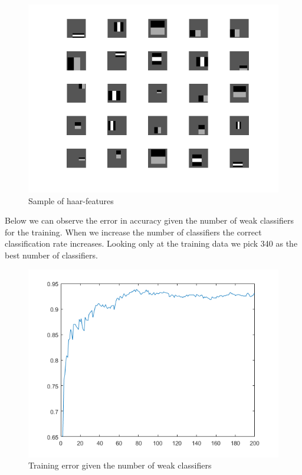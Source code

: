 \documentclass[a4paper,12pt]{article}
\begin{document}
\begin{figure}[H]
\centering
\caption{Sample of haar-features}\label{fig:sample_haar_features}
  \begin{minipage}[]{0.8\textwidth}
  \includegraphics[width=\textwidth]{figures/sample_of_haar_features.png}
  \end{minipage}
\end{figure}

Below we can observe the error in accuracy given the number of weak classifiers for the training. When we increase the number of classifiers the correct classification rate increases. Looking only at the training data we pick 340 as the best number of classifiers.
\begin{figure}[H]
\centering
\caption{Training error given the number of weak classifiers}\label{fig:train_error}
  \begin{minipage}[]{0.80\textwidth}
  \includegraphics[width=\textwidth]{figures/train_error.png}
  \end{minipage}
\end{figure}
\end{document}
